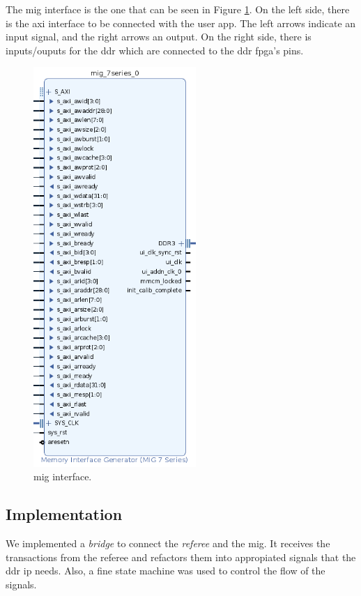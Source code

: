 The \gls{mig} interface is the one that can be seen in Figure \ref{fig:mig}.
On the left side, there is the \gls{axi} interface to be connected with the user app. The left arrows indicate an input signal, and the right arrows an output.
On the right side, there is inputs/ouputs for the \gls{ddr} which are connected to the \gls{ddr} \gls{fpga}'s pins.

\begin{figure}
    \centering
    \includegraphics[width=0.55\textwidth]{images/mig_interface.png}
    \caption{\gls{mig} interface.}
    \label{fig:mig}
\end{figure}

\subsection{Implementation}
We implemented a \textit{bridge} to connect the \textit{referee} and the \gls{mig}.
It receives the transactions from the referee and refactors them into appropiated signals that the \gls{ddr} \gls{ip} needs. Also, a fine state machine was used to control the flow of the signals.

